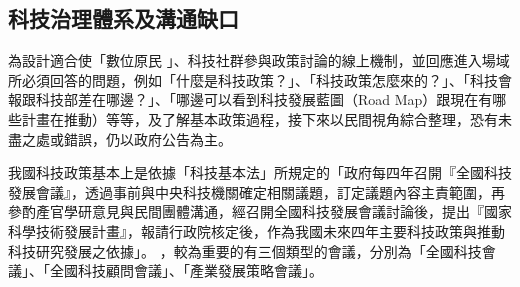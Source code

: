 \documentclass[12pt,a4paper]{article}
\begin{document}
\subsection{科技治理體系及溝通缺口 }
\label{sec:org8d7605e}
為設計適合使「數位原民 」、科技社群參與政策討論的線上機制，並回應進入場域所必須回答的問題，例如「什麼是科技政策？」、「科技政策怎麼來的？」、「科技會報跟科技部差在哪邊？」、「哪邊可以看到科技發展藍圖（Road Map）跟現在有哪些計畫在推動）等等，及了解基本政策過程，接下來以民間視角綜合整理，恐有未盡之處或錯誤，仍以政府公告為主。

我國科技政策基本上是依據「科技基本法」所規定的「政府每四年召開『全國科技發展會議』，透過事前與中央科技機關確定相關議題，訂定議題內容主責範圍，再參酌產官學研意見與民間團體溝通，經召開全國科技發展會議討論後，提出『國家科學技術發展計畫』，報請行政院核定後，作為我國未來四年主要科技政策與推動科技研究發展之依據」。 \citep*{guo17} ，較為重要的有三個類型的會議，分別為「全國科技會議」、「全國科技顧問會議」、「產業發展策略會議」。
\end{document}
